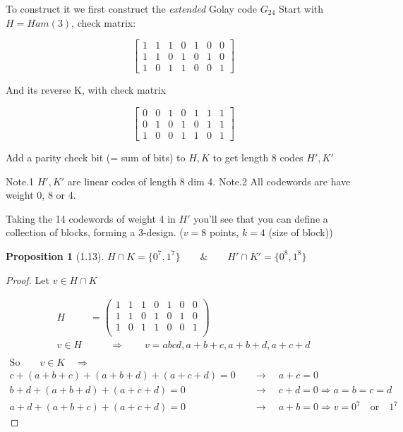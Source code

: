 \documentclass[]{amsart}
\newtheorem{prop}[thm]{Proposition}
\theoremstyle{definition}
\theoremstyle{remark}
\numberwithin{equation}{section}
\begin{document}
To construct it we first construct the \emph{extended} Golay code $G_24$
Start with $H = Ham(3)$, check matrix:

\[
	\begin{bmatrix}
	1 & 1 & 1 & 0 & 1 & 0 & 0  \\
	1 & 1 & 0 & 1 & 0 & 1 & 0  \\
	1 & 0 & 1 & 1 & 0 & 0 & 1
	\end{bmatrix}
\]

And its reverse K, with check matrix

\[
	\begin{bmatrix}
	0 & 0 & 1 & 0 & 1 & 1 & 1\\
	0 & 1 & 0 & 1 & 0 & 1 & 1\\
	1 & 0 & 0 & 1 & 1 & 0 & 1
	\end{bmatrix}
\]

Add a parity check bit (= sum of bits) to $H, K$ to get length 8 codes $H', K'$


Note.1 $H', K'$ are linear codes of length 8 dim 4.
Note.2 All codewords are have weight 0, 8 or 4.

Taking the 14 codewords of weight 4 in $H'$ you'll see that you can define a collection of blocks, forming a 3-design. ($v=8$ points, $k=4$ (size of block))

\begin{prop}[1.13]
$H \cap K = \{0^7, 1^7\} \qquad \&  \qquad H'\cap K' = \{0^8, 1^8 \}$
\end{prop}

\begin{proof}
Let $v\in H\cap K$

\begin{align*}
	H &= \begin{pmatrix}
		1 & 1 & 1 & 0 & 1 & 0 & 0 \\
		1 & 1 & 0 & 1 & 0 & 1 & 0 \\
		1 & 0 & 1 & 1 & 0 & 0 & 1 \\
	\end{pmatrix} \\
	v \in H & \qquad \Rightarrow \qquad v = abcd, a+b+c, a+b+d, a+c+d\\
\end{align*}
\begin{align*}
\text{So} \qquad v \in K \quad\Rightarrow\quad \\
	c + (a+b+c) + (a+b+d) + (a+c+d) = 0 &\quad\rightarrow\quad a +c = 0\\
	b + d + (a + b + d) + (a + c +d)= 0 &\quad\rightarrow\quad c + d = 0 \Rightarrow a = b = c = d \\
	a + d + (a + b + c) + (a + c +d)= 0 &\quad\rightarrow\quad a + b = 0 \Rightarrow v = 0^7\quad\text{or}\quad 1^7
\end{align*}
\end{proof}
\end{document}
